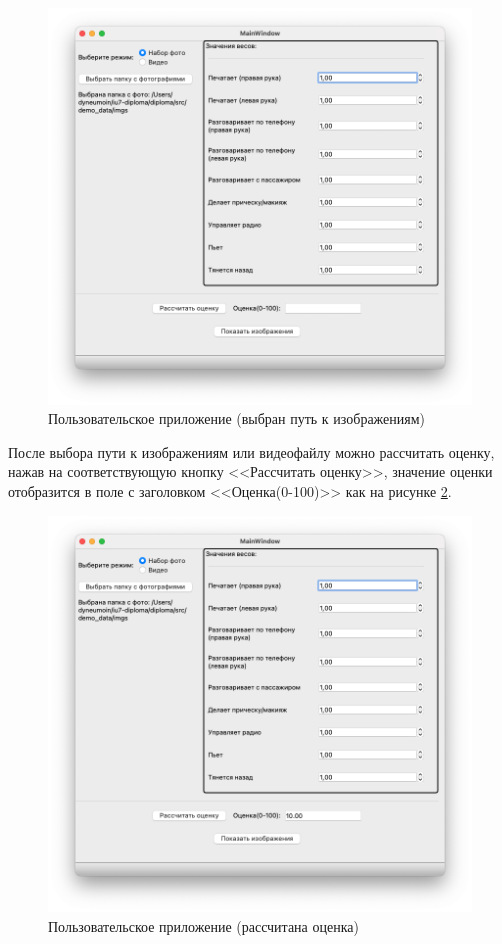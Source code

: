 \begin{figure}[H]
	\centering
	\includegraphics[scale=0.55]{img/example_app_1.png}
	\caption{Пользовательское приложение (выбран путь к изображениям)}
	\label{fig:example_app_1}
\end{figure}
\clearpage

После выбора пути к изображениям или видеофайлу можно рассчитать оценку, нажав на соответствующую кнопку <<Рассчитать оценку>>, значение оценки отобразится в поле с заголовком <<Оценка(0-100)>> как на рисунке \ref{fig:example_app_2}.

\begin{figure}[H]
	\centering
	\includegraphics[scale=0.55]{img/example_app_2.png}
	\caption{Пользовательское приложение (рассчитана оценка)}
	\label{fig:example_app_2}
\end{figure}

